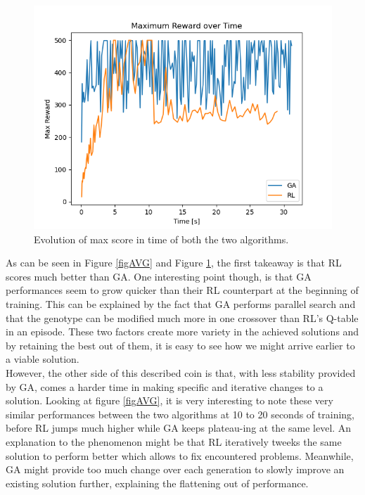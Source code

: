 \begin{figure}[H]
	\centering
	\includegraphics [scale = 0.5]{Images/RL_GA_comparison_max.png}
	\caption{Evolution of max score in time of both the two algorithms.}
	\label{figMAX}
\end{figure}

As can be seen in Figure \ref{figAVG} and Figure \ref{figMAX}, the first takeaway is that RL scores much better than GA.
One interesting point though, is that GA performances seem to grow quicker than their RL counterpart at the beginning of training.
This can be explained by the fact that GA performs parallel search and that the genotype can be modified much more in one crossover than RL's Q-table in an episode. 
These two factors create more variety in the achieved solutions and by retaining the best out of them, it is easy to see how we might arrive earlier to a viable solution.
\\
However, the other side of this described coin is that, with less stability provided by GA, comes a harder time in making specific and iterative changes to a solution.
Looking at figure \ref{figAVG}, it is very interesting to note these very similar performances between the two algorithms at 10 to 20 seconds of training, before RL jumps much higher while GA keeps plateau-ing at the same level.
An explanation to the phenomenon might be that RL iteratively tweeks the same solution to perform better which allows to fix encountered problems. Meanwhile, GA might provide too much change over each generation to slowly improve an existing solution further, explaining the flattening out of performance.

